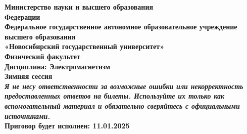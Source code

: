 \documentclass[a4paper,12pt]{article}
\newcommand{\kr}[1]{\textit{#1}}
\begin{document}
\begin{titlepage}
    \begin{center}
        \textbf{\large Министерство науки и высшего образования}\\
        \textbf{ Федерации} \\
        \textbf{\large Федеральное государственное автономное образовательное
                        учреждение высшего образования} \\
        \textbf{\large «Новосибирский государственный университет» } \\
        \vspace{1em}
        \textbf{\large Физический факультет} \\
        \vspace{5em}
        \textbf{\Large Дисциплина: Электромагнетизм} \\
        \vspace{2em}
        \textbf{\Large Зимняя сессия } \\
        \vspace{25em}
        \textbf{\kr {Я не несу ответственности за возможные ошибки или некорректность предоставленных ответов на билеты. Используйте их только как вспомогательный материал и обязательно сверяйтесь с официальными источниками.}  } \\
        \vspace{3em}
        \textbf{\large Приговор будет исполнен: 11.01.2025}\\
    \end{center}
\end{titlepage}

\newpage
\tableofcontents %
\newpage


    \newpage



    \newpage











	

	\newpage





\end{document}
